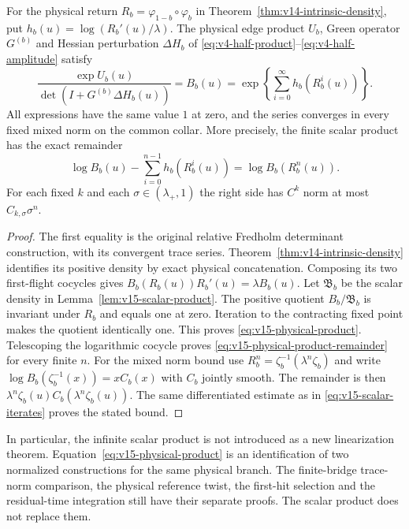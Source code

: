 \begin{corollary}
\label{cor:v15-determinant-product}
For the physical return $R_b=\varphi_{1-b}\circ\varphi_b$ in
Theorem~\ref{thm:v14-intrinsic-density}, put
$h_b(u)=\log(R_b'(u)/\lambda)$. The physical edge product $U_b$,
Green operator $G^{(b)}$ and Hessian perturbation $\Delta H_b$ of
\eqref{eq:v4-half-product}--\eqref{eq:v4-half-amplitude} satisfy
\begin{equation}\label{eq:v15-physical-product}
 \frac{\exp U_b(u)}{\det(I+G^{(b)}\Delta H_b(u))}
       =B_b(u)
       =\exp\!\left\{\sum_{i=0}^{\infty}h_b(R_b^i(u))\right\}.
\end{equation}
All expressions have the same value $1$ at zero, and the series
converges in every fixed mixed norm on the common collar. More
precisely, the finite scalar product has the exact remainder
\begin{equation}\label{eq:v15-physical-product-remainder}
 \log B_b(u)-\sum_{i=0}^{n-1}h_b(R_b^i(u))
                           =\log B_b(R_b^n(u)).
\end{equation}
For each fixed $k$ and each $\sigma\in(\lambda_+,1)$ the right
side has $C^k$ norm at most $C_{k,\sigma}\sigma^n$.
\end{corollary}
\begin{proof}
The first equality is the original relative Fredholm determinant
construction, with its convergent trace series. Theorem~\ref{thm:v14-intrinsic-density}
identifies its positive density by exact physical concatenation.
Composing its two first-flight cocycles gives
$B_b(R_b(u))R_b'(u)=\lambda B_b(u)$.
Let $\mathfrak B_b$ be the scalar density in
Lemma~\ref{lem:v15-scalar-product}. The positive quotient
$B_b/\mathfrak B_b$ is invariant under $R_b$ and equals one at
zero. Iteration to the contracting fixed point makes the quotient
identically one. This proves \eqref{eq:v15-physical-product}.
Telescoping the logarithmic cocycle proves
\eqref{eq:v15-physical-product-remainder} for every finite $n$.
For the mixed norm bound use
$R_b^n=\zeta_b^{-1}(\lambda^n\zeta_b)$ and write
$\log B_b(\zeta_b^{-1}(x))=xC_b(x)$ with $C_b$ jointly smooth.
The remainder is then $\lambda^n\zeta_b(u)C_b(\lambda^n\zeta_b(u))$.
The same differentiated estimate as in
\eqref{eq:v15-scalar-iterates} proves the stated bound.
\end{proof}

In particular, the infinite scalar product is not introduced as a new
linearization theorem. Equation~\eqref{eq:v15-physical-product} is
an identification of two normalized constructions for the same physical
branch. The finite-bridge trace-norm comparison, the physical reference
twist, the first-hit selection and the residual-time integration still
have their separate proofs. The scalar product does not replace them.
